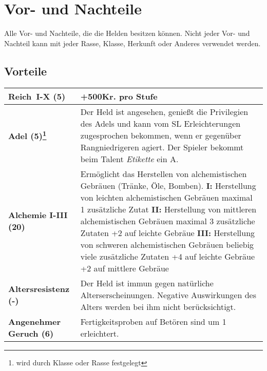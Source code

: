 \newpage
{\let\clearpage\relax\chapter{Vor- und Nachteile}
\label{chap:vor_und_nachteile}}
Alle Vor- und Nachteile, die die Helden besitzen können. Nicht jeder Vor- und Nachteil kann mit jeder Rasse, Klasse, Herkunft oder Anderes verwendet werden.

\section{Vorteile}
\label{chap:vorteile}
\begin{longtable}{|p{5cm}|p{11cm}|}

\hline
\textbf{Reich~I-X (5)} & +500Kr. pro Stufe \\ \hline

\textbf{Adel (5)\footnote{wird durch Klasse oder Rasse festgelegt}} & Der Held ist angesehen, genießt die Privilegien des Adels und kann vom SL Erleichterungen zugesprochen bekommen, wenn er gegenüber Rangniedrigeren agiert. Der Spieler bekommt beim Talent \textit{Etikette} ein A. \\ \hline

\textbf{Alchemie I-III (20)} & Ermöglicht das Herstellen von alchemistischen Gebräuen (Tränke, Öle, Bomben). \newline \textbf{I:} Herstellung von leichten alchemistischen Gebräuen \newline maximal 1 zusätzliche Zutat \newline \textbf{II:} Herstellung von mittleren alchemistischen Gebräuen \newline maximal 3 zusätzliche Zutaten \newline +2 auf leichte Gebräue \newline \textbf{III:} Herstellung von schweren alchemistischen Gebräuen \newline beliebig viele zusätzliche Zutaten \newline +4 auf leichte Gebräue \newline +2 auf mittlere Gebräue \\ \hline

\textbf{Altersresistenz (-)\footnotemark[1]} & Der Held ist immun gegen natürliche Alterserscheinungen. Negative Auswirkungen des Alters werden bei ihm nicht berücksichtigt. \\ \hline

\textbf{Angenehmer Geruch (6)} & Fertigkeitsproben auf Betören sind um 1 erleichtert. \\ \hline


\end{longtable}
